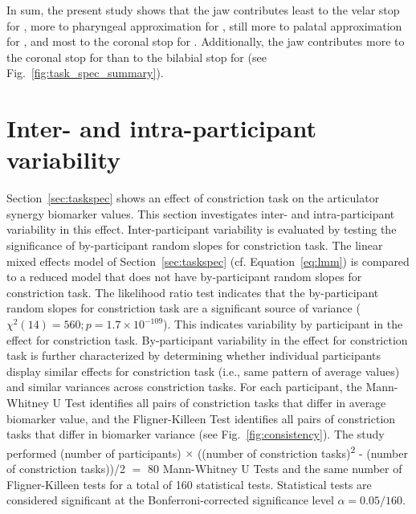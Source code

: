 \documentclass[preprint]{JASAnew}\usepackage[]{graphicx}\usepackage[]{color}
\begin{document}
In sum, the present study shows that the jaw contributes 
least to the velar stop for \textipa{[k]},
more to pharyngeal approximation for \textipa{[A]}, 
still more to palatal approximation for \textipa{[i]},
and most to the coronal stop for \textipa{[t]}.
Additionally, the jaw contributes more to the coronal stop for \textipa{[t]} than to the bilabial stop for \textipa{[p]} (see Fig.~\ref{fig:task_spec_summary}).








\section{Inter- and intra-participant variability}
\label{sec:patterns}





Section~\ref{sec:taskspec} shows an effect of constriction task on the articulator synergy biomarker values. 
%
This section investigates inter- and intra-participant variability in this effect.
%
Inter-participant variability is evaluated by testing the significance of by-participant random slopes for constriction task.
%
The linear mixed effects model of Section~\ref{sec:taskspec} (cf. Equation~\ref{eq:lmm}) is compared to a reduced model that does not have by-participant random slopes for constriction task.
%
The likelihood ratio test indicates that the by-participant random slopes for constriction task are a significant source of variance ($\chi^2(14)= 560; p = \ensuremath{1.7\times 10^{-109}}$).
%
This indicates variability by participant in the effect for constriction task.
%
By-participant variability in the effect for constriction task is further characterized by determining whether individual participants display similar effects for constriction task (i.e., same pattern of average values) and similar variances across constriction tasks.
%
For each participant, the Mann-Whitney U Test identifies all pairs of constriction tasks that differ in average biomarker value,
and the Fligner-Killeen Test identifies all pairs of constriction tasks that differ in biomarker variance (see Fig.~\ref{fig:consistency}).
%
The study performed (number of participants) $\times$ ((number of constriction tasks)\textsuperscript{2} - (number of constriction tasks))/2 $=$ \num{80} Mann-Whitney U Tests and the same number of Fligner-Killeen tests for a total of \num{160} statistical tests. 
%
Statistical tests are considered significant at the Bonferroni-corrected significance level $\alpha = 0.05/160$.
\end{document}

